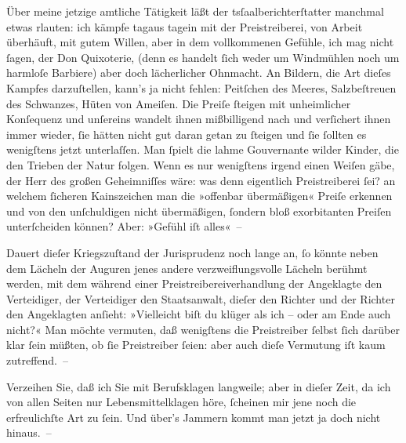 \pstart
           Über meine jetzige amtliche Tätigkeit läßt der tsſaalberichterſtatter manchmal etwas rlauten: ich kämpfe tagaus tagein mit der Preistreiberei, von Arbeit
               überhäuft, mit gutem Willen, aber in dem vollkommenen Gefühle, ich mag nicht{ }ſagen,
               der Don Quixoterie,  (denn es handelt{ }ſich weder um Windmühlen noch um
               harmloſe Barbiere) aber doch lächerlicher Ohnmacht. An Bildern, die Art dieſes
               Kampfes darzuſtellen, kann’s ja nicht fehlen: Peitſchen des Meeres, Salzbeſtreuen des
               Schwanzes, Hüten von Ameiſen. Die Preiſe{ }ſteigen mit unheimlicher Konſequenz und
               unſereins wandelt ihnen mißbilligend nach {\pb}und
               verſichert ihnen immer wieder,{ }ſie hätten nicht gut daran getan zu{ }ſteigen und{ }ſie{ }ſollten es wenigſtens jetzt unterlaſſen. Man{ }ſpielt die lahme Gouvernante wilder
               Kinder, die den Trieben der Natur folgen. Wenn es nur wenigſtens irgend einen Weiſen
               gäbe, der Herr des großen Geheimniſſes wäre: was denn eigentlich Preistreiberei{ }ſei?
               an welchem{ }ſicheren Kainszeichen man die »offenbar übermäßigen« Preiſe erkennen und
               von den unſchuldigen nicht übermäßigen,{ }ſondern bloß exorbitanten Preiſen
               unterſcheiden können? Aber: »Gefühl iſt alles« –\pend
           
\pstart
           Dauert dieſer Kriegszuſtand der Jurisprudenz noch lange an,{ }ſo könnte neben dem
               Lächeln der Auguren jenes andere verzweiflungsvolle Lächeln berühmt werden, mit dem
               während einer Preistreibereiverhandlung der Angeklagte den Verteidiger, der
               Verteidiger den Staatsanwalt, dieſer den Richter und der Richter den Angeklagten
               anſieht: »Vielleicht biſt du {\pb}klüger als ich – oder am
               Ende auch nicht?« Man möchte vermuten, daß wenigſtens die Preistreiber \introOben{}\introOben{}{ }ſelbst \introOben{}ſich\introOben{} darüber klar{ }ſein müßten, ob{ }ſie Preistreiber{ }ſeien: aber auch dieſe Vermutung iſt  kaum zutreffend. –\pend
           
\pstart
           Verzeihen Sie, daß ich Sie mit Berufsklagen langweile; aber in dieſer Zeit, da ich
               von allen Seiten nur Lebensmittelklagen höre,{ }ſcheinen mir jene noch die
               erfreulichſte Art zu{ }ſein. Und über’s Jammern kommt man jetzt ja doch nicht
               hinaus. –\pend
           
